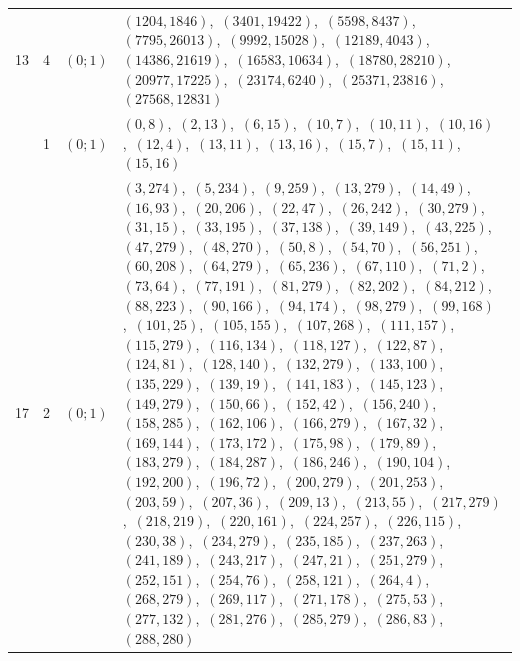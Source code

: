 \documentclass[11pt]{article}
\begin{document}
\begin{longtable}{@{}rrl>{\raggedright\arraybackslash}p{}@{}}
13 & 4 & $(0;1)$ & $(1204,1846)$,\allowbreak\ $(3401,19422)$,\allowbreak\ $(5598,8437)$,\allowbreak\ $(7795,26013)$,\allowbreak\ $(9992,15028)$,\allowbreak\ $(12189,4043)$,\allowbreak\ $(14386,21619)$,\allowbreak\ $(16583,10634)$,\allowbreak\ $(18780,28210)$,\allowbreak\ $(20977,17225)$,\allowbreak\ $(23174,6240)$,\allowbreak\ $(25371,23816)$,\allowbreak\ $(27568,12831)$\\
\addlinespace[3pt]
17 & 1 & $(0;1)$ & $(0,8)$,\allowbreak\ $(2,13)$,\allowbreak\ $(6,15)$,\allowbreak\ $(10,7)$,\allowbreak\ $(10,11)$,\allowbreak\ $(10,16)$,\allowbreak\ $(12,4)$,\allowbreak\ $(13,11)$,\allowbreak\ $(13,16)$,\allowbreak\ $(15,7)$,\allowbreak\ $(15,11)$,\allowbreak\ $(15,16)$\\
17 & 2 & $(0;1)$ & $(3,274)$,\allowbreak\ $(5,234)$,\allowbreak\ $(9,259)$,\allowbreak\ $(13,279)$,\allowbreak\ $(14,49)$,\allowbreak\ $(16,93)$,\allowbreak\ $(20,206)$,\allowbreak\ $(22,47)$,\allowbreak\ $(26,242)$,\allowbreak\ $(30,279)$,\allowbreak\ $(31,15)$,\allowbreak\ $(33,195)$,\allowbreak\ $(37,138)$,\allowbreak\ $(39,149)$,\allowbreak\ $(43,225)$,\allowbreak\ $(47,279)$,\allowbreak\ $(48,270)$,\allowbreak\ $(50,8)$,\allowbreak\ $(54,70)$,\allowbreak\ $(56,251)$,\allowbreak\ $(60,208)$,\allowbreak\ $(64,279)$,\allowbreak\ $(65,236)$,\allowbreak\ $(67,110)$,\allowbreak\ $(71,2)$,\allowbreak\ $(73,64)$,\allowbreak\ $(77,191)$,\allowbreak\ $(81,279)$,\allowbreak\ $(82,202)$,\allowbreak\ $(84,212)$,\allowbreak\ $(88,223)$,\allowbreak\ $(90,166)$,\allowbreak\ $(94,174)$,\allowbreak\ $(98,279)$,\allowbreak\ $(99,168)$,\allowbreak\ $(101,25)$,\allowbreak\ $(105,155)$,\allowbreak\ $(107,268)$,\allowbreak\ $(111,157)$,\allowbreak\ $(115,279)$,\allowbreak\ $(116,134)$,\allowbreak\ $(118,127)$,\allowbreak\ $(122,87)$,\allowbreak\ $(124,81)$,\allowbreak\ $(128,140)$,\allowbreak\ $(132,279)$,\allowbreak\ $(133,100)$,\allowbreak\ $(135,229)$,\allowbreak\ $(139,19)$,\allowbreak\ $(141,183)$,\allowbreak\ $(145,123)$,\allowbreak\ $(149,279)$,\allowbreak\ $(150,66)$,\allowbreak\ $(152,42)$,\allowbreak\ $(156,240)$,\allowbreak\ $(158,285)$,\allowbreak\ $(162,106)$,\allowbreak\ $(166,279)$,\allowbreak\ $(167,32)$,\allowbreak\ $(169,144)$,\allowbreak\ $(173,172)$,\allowbreak\ $(175,98)$,\allowbreak\ $(179,89)$,\allowbreak\ $(183,279)$,\allowbreak\ $(184,287)$,\allowbreak\ $(186,246)$,\allowbreak\ $(190,104)$,\allowbreak\ $(192,200)$,\allowbreak\ $(196,72)$,\allowbreak\ $(200,279)$,\allowbreak\ $(201,253)$,\allowbreak\ $(203,59)$,\allowbreak\ $(207,36)$,\allowbreak\ $(209,13)$,\allowbreak\ $(213,55)$,\allowbreak\ $(217,279)$,\allowbreak\ $(218,219)$,\allowbreak\ $(220,161)$,\allowbreak\ $(224,257)$,\allowbreak\ $(226,115)$,\allowbreak\ $(230,38)$,\allowbreak\ $(234,279)$,\allowbreak\ $(235,185)$,\allowbreak\ $(237,263)$,\allowbreak\ $(241,189)$,\allowbreak\ $(243,217)$,\allowbreak\ $(247,21)$,\allowbreak\ $(251,279)$,\allowbreak\ $(252,151)$,\allowbreak\ $(254,76)$,\allowbreak\ $(258,121)$,\allowbreak\ $(264,4)$,\allowbreak\ $(268,279)$,\allowbreak\ $(269,117)$,\allowbreak\ $(271,178)$,\allowbreak\ $(275,53)$,\allowbreak\ $(277,132)$,\allowbreak\ $(281,276)$,\allowbreak\ $(285,279)$,\allowbreak\ $(286,83)$,\allowbreak\ $(288,280)$\\

\end{longtable}
\end{document}
